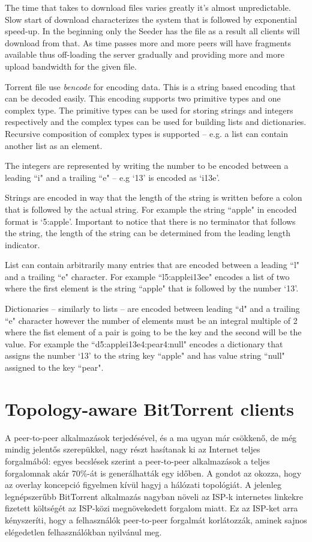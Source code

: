 \documentclass[a4paper]{article}
\begin{document}
The time that takes to download files varies greatly it's almost unpredictable. Slow start of download characterizes
the system that is followed by exponential speed-up. In the beginning only the Seeder has the file as a result all
clients will download from that. As time passes more and more peers will have fragments available thus off-loading the
server gradually and providing more and more upload bandwidth for the given file.

Torrent file use \emph{bencode} for encoding data. This is a string based encoding that can be decoded easily. This
encoding supports two primitive types and one complex type. The primitive types can be used for storing strings and
integers respectively and the complex types can be used for building lists and dictionaries. Recursive composition of
complex types is supported -- e.g. a list can contain another list as an element.

The integers are represented by writing the number to be encoded between  a leading ``i" and a trailing ``e" -- e.g
`13' is encoded as `i13e'.

Strings are encoded in way that the length of the string is written before a colon that is followed by the actual
string. For example the string ``apple" in encoded format is `5:apple'. Important to notice that there is no terminator
that follows the string, the length of the string can be determined from the leading length indicator.

List can contain arbitrarily many entries that are encoded between a leading ``l" and a trailing ``e" character. For
example ``l5:applei13ee" encodes a list of two where the first element is the string ``apple" that is followed by the
number `13'.

Dictionaries -- similarly to lists -- are encoded between leading ``d" and a trailing ``e" character however the number
of elements must be an integral multiple of 2 where the fist element of a pair is going to be the key and the second
will be the value. For example the ``d5:applei13e4:pear4:null" encodes a dictionary that assigns the number `13' to the
string key ``apple" and has value string ``null" assigned to the key ``pear".

\section{Topology-aware BitTorrent clients}

A peer-to-peer alkalmazások terjedésével, és a ma ugyan már csökkenő, de még mindig jelentős szerepükkel, nagy részt
hasítanak ki az Internet teljes forgalmából: egyes becslések szerint a peer-to-peer alkalmazások a teljes forgalomnak
akár 70\%-át is generálhatták egy időben. A gondot az okozza, hogy az overlay koncepció figyelmen kívül hagyj a
hálózati topológiát. A jelenleg legnépszerűbb BitTorrent alkalmazás nagyban növeli az ISP-k internetes linkekre
fizetett költségét az ISP-közi megnövekedett forgalom miatt. Ez az ISP-ket arra kényszeríti, hogy a felhasználók
peer-to-peer forgalmát korlátozzák, aminek sajnos elégedetlen felhasználókban nyilvánul meg.
\end{document}
